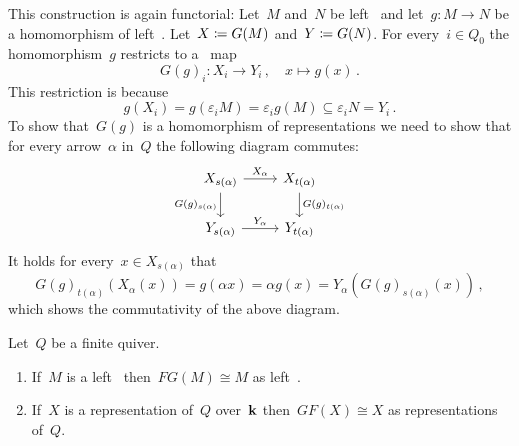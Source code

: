 \begin{remark}
\begin{enumerate}
      This construction is again functorial:
      Let~$M$ and~$N$ be left~{} and let~$g \colon M \to N$ be a homomorphism of left~{}.
      Let~$X \coloneqq G(M)$ and~$Y \coloneqq G(N)$.
      For every~$i \in Q_0$ the homomorphism~$g$ restricts to a~{\klin} map
      \[
                G(g)_i
        \colon  X_i
        \to     Y_i \,,
        \quad   x
        \mapsto g(x) \,.
      \]
      This restriction is {\welldef} because
      \[
                  g(X_i)
        =         g(\varepsilon_i M)
        =         \varepsilon_i g(M)
        \subseteq \varepsilon_i N
        =         Y_i \,.
      \]
      To show that~$G(g)$ is a homomorphism of representations we need to show that for every arrow~$\alpha$ in~$Q$ the following diagram commutes:
      \[
        \begin{tikzcd}
            X_{s(\alpha)}
            \arrow{r}[above]{X_\alpha}
            \arrow{d}[left]{G(g)_{s(\alpha)}}
          & X_{t(\alpha)}
            \arrow{d}[right]{G(g)_{t(\alpha)}}
          \\
            Y_{s(\alpha)}
            \arrow{r}[above]{Y_\alpha}
          & Y_{t(\alpha)}
        \end{tikzcd}
      \]
      It holds for every~$x \in X_{s(\alpha)}$ that
      \[
          G(g)_{t(\alpha)}( X_\alpha( x ) )
        = g(\alpha x)
        = \alpha g(x)
        = Y_\alpha( G(g)_{s(\alpha)}(x) ) \,,
      \]
      which shows the commutativity of the above diagram.
  \end{enumerate}
\end{remark}


\begin{theorem}
  Let~$Q$ be a finite quiver.
  \begin{enumerate}
    \item
      If~$M$ is a left~{} then~$FG(M) \cong M$ as left~{}.
    \item
      If~$X$ is a representation of~$Q$ over~$\mathbf{k}$ then~$GF(X) \cong X$ as representations of~$Q$.
  \end{enumerate}
\end{theorem}


